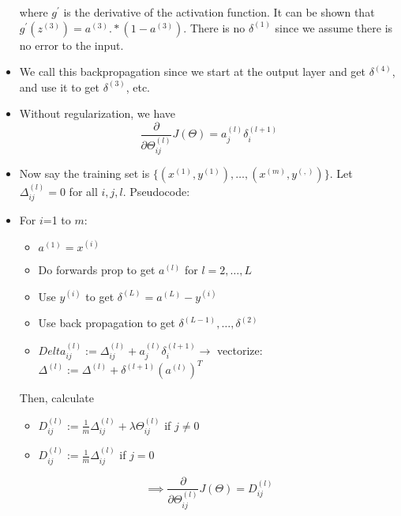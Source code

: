 \documentclass[10pt]{article}
\begin{document}
\begin{itemize}
\begin{equation*}
    \end{equation*}
    where $g^{\prime}$ is the derivative of the activation function. It can be shown that $g^{\prime}(z^{(3)}) = a^{(3)}.*\left(1-a^{(3)}\right)$. There is no $\delta^{(1)}$ since we assume there is no error to the input.
  \item We call this backpropagation since we start at the output layer and get $\delta^{(4)}$, and use it to get $\delta^{(3)}$, etc.
  \item Without regularization, we have 
    \begin{equation*}
      \frac{ \partial }{\partial \Theta_{ij}^{(l)}} J (\Theta) = a_j^{(l)} \delta_i^{(l+1)}
    \end{equation*}
  \item Now say the training set is $\{ (x^{(1)}, y^{(1)}), \dots, (x^{(m)}, y^{(,)})\}$. Let $\Delta_{ij}^{(l)}=0$ for all $i,j,l$. Pseudocode:
  \item For $i$=1 to $m$:
    \begin{itemize}
      \item  $a^{(1)} = x^{(i)}$
      \item Do forwards prop to get $a^{(l)}$ for $l=2,\dots,L$
      \item Use $y^{(i)}$ to get $\delta^{(L)} = a^{(L)} - y^{(i)}$
      \item Use back propagation to get $\delta^{(L-1)},\dots,\delta^{(2)}$
      \item $Delta_{ij}^{(l)} := \Delta_{ij}^{(l)} + a_j^{(l)}\delta_i^{(l+1)} \rightarrow$ vectorize: $\Delta^{(l)} := \Delta^{(l)} + \delta^{(l+1)}(a^{(l)})^T$
    \end{itemize}
    Then, calculate
    \begin{itemize}
      \item $D_{ij}^{(l)} := \frac{1}{m} \Delta_{ij}^{(l)} + \lambda \Theta_{ij}^{(l)}$ if $j \neq 0$
      \item $D_{ij}^{(l)} := \frac{1}{m} \Delta_{ij}^{(l)}$ if $j =0$
    \end{itemize}
    \begin{equation*}
      \implies \frac{\partial}{\partial \Theta_{ij}^{(l)}} J( \Theta ) = D_{ij}^{(l)}
    \end{equation*}
      
\end{itemize}
\end{document}
